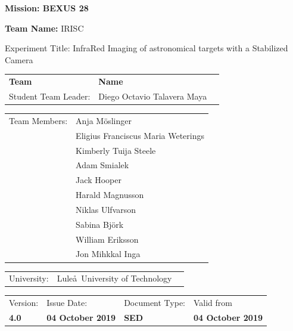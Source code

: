 \documentclass[a4paper,12pt,oneside]{article}
\begin{document}
\begin{flushleft}
\vspace{5pt}

\noindent \textbf{\hspace{-1pt}Mission: BEXUS 28} \\

\vspace{20pt}

{\hspace{-2pt}\noindent \Large{\textbf{Team Name:} } IRISC} \\

\vspace{20pt}

\hspace{-1pt}Experiment Title: InfraRed Imaging of astronomical targets with a Stabilized Camera\\

\vspace{20pt}
\begin{tabular}{p{} p{} p{}}
\textbf{Team} & \textbf{Name}  \\
Student Team Leader: & Diego Octavio Talavera Maya \\
\end{tabular}
\vspace{5pt}
\begin{tabular}{p{} p{}}
	Team Members:  	& Anja M\"oslinger \\
					& Eligius Franciscus Maria Weterings \\
					& Kimberly Tuija Steele \\
					& Adam Smialek \\
					& Jack Hooper\\
					& Harald Magnusson \\
					& Niklas Ulfvarson \\
					& Sabina Bj\"ork \\
					& William Eriksson \\
					& Jon Mihkkal Inga \\
\end{tabular}

\begin{tabular}{p{} p{} p{}}
University: & Lule\aa \ University of Technology
\end{tabular}

\vspace{0.25cm} 

\begin{tabular}{p{} p{} p{} p{}}
\footnotesize{Version:}     & \footnotesize{Issue Date:} & \footnotesize{Document Type:} & \footnotesize{Valid from} \\
\textbf{4.0}          & \textbf{04 October 2019}    & \textbf{SED}   & \textbf{04 October 2019}
\end{tabular}


\end{flushleft}
\end{document}
